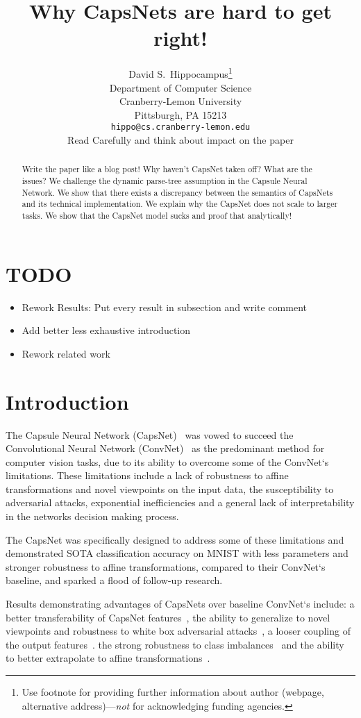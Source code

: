 \documentclass{article}
\title{                                                                                                                                          
	Why CapsNets are hard to get right!
}
\author{%
  David S.~Hippocampus\thanks{Use footnote for providing further information
    about author (webpage, alternative address)---\emph{not} for acknowledging
    funding agencies.} \\
  Department of Computer Science\\
  Cranberry-Lemon University\\
  Pittsburgh, PA 15213 \\
  \texttt{hippo@cs.cranberry-lemon.edu} \\Read Carefully and think about impact on the paper
}
\begin{document}
\maketitle

\begin{abstract}
  Write the paper like a blog post!
  Why haven't CapsNet taken off? What are the issues?
  We challenge the dynamic parse-tree assumption in the Capsule Neural Network.
  We show that there exists a discrepancy between the semantics of CapsNets and its technical implementation.
  We explain why the CapsNet does not scale to larger tasks.
  We show that the CapsNet model sucks and proof that analytically!
\end{abstract}

\section{TODO}
\begin{itemize}
	\item Rework Results: Put every result in subsection and write comment
	\item Add better less exhaustive introduction
	\item Rework related work
\end{itemize}

\section{Introduction}

The Capsule Neural Network (CapsNet)~\cite{nips/SabourFH17} was vowed to succeed the Convolutional Neural Network (ConvNet)~\cite{neco/LeCunBDHHHJ89} as the predominant method for computer vision tasks, due to its ability to overcome some of the ConvNet`s limitations. %
These limitations include
a lack of robustness to affine transformations and novel viewpoints on the input data, 
the susceptibility to adversarial attacks,
exponential inefficiencies
and a general lack of interpretability in the networks decision making process. %

The CapsNet was specifically designed to address some of these limitations and demonstrated SOTA classification accuracy on MNIST with less parameters and stronger robustness to affine transformations, compared to their ConvNet`s baseline, and sparked a flood of follow-up research.

Results demonstrating advantages of CapsNets over baseline ConvNet`s include:
a better transferability of CapsNet features~\cite{corr/Ancheng2018},
the ability to generalize to novel viewpoints and robustness to white box adversarial attacks~\cite{iclr/HintonSF18},
a looser coupling of the output features~\cite{corr/Lin2018}.
the strong robustness to class imbalances~\cite{miccai/Jimenez-Sanchez18} and
the ability to better extrapolate to affine transformations~\cite{cvpr/GuT20}.
\end{document}
